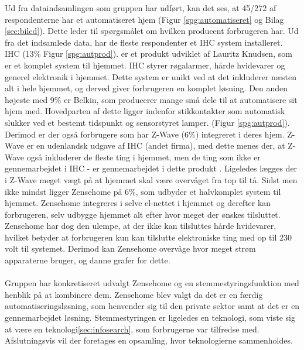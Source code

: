 Ud fra dataindsamlingen som gruppen har udført, kan det ses, at 45/272 af respondenterne har et automatiseret hjem (Figur \ref{spg:automatiseret} og Bilag \ref{sec:bilcd}). Dette leder til spørgsmålet om hvilken producent forbrugeren har. Ud fra det indsamlede data, har de fleste respondenter et IHC system installeret.
IHC (13\% Figur \ref{spg:autprod}). er et produkt udviklet af Lauritz Knudsen, som er et komplet system til hjemmet. IHC styrer røgalarmer, hårde hvidevarer og generel elektronik i hjemmet. Dette system er unikt ved at det inkluderer næsten alt i hele hjemmet, og derved giver forbrugeren en komplet løsning. Den anden højeste med 9\% er Belkin, som producerer mange små dele til at automatisere sit hjem med. Hovedparten af dette ligger indenfor stikkontakter som automatisk slukker ved et bestemt tidspunkt og sensorstyret lamper. (Figur \ref{spg:autprod}). Derimod er der også forbrugere som har Z-Wave (6\%) integreret i deres hjem. Z-Wave er en udenlandsk udgave af IHC (andet firma), med dette menes der, at Z-Wave også inkluderer de fleste ting i hjemmet, men de ting som ikke er gennemarbejdet i IHC - er gennemarbejdet i dette produkt \cite{IHCForum}. Ligeledes lægges der i Z-Wave meget vægt på at hjemmet skal være overvåget fra top til tå. Sidst men ikke mindst ligger Zensehome på 6\%, som udbyder et halvkomplet system til hjemmet. Zensehome integreres i selve el-nettet i hjemmet og derefter kan forbrugeren, selv udbygge hjemmet alt efter hvor meget der ønskes tilsluttet. Zensehome har dog den ulempe, at der ikke kan tilsluttes hårde hvidevarer, hvilket betyder at forbrugeren kun kan tilslutte elektroniske ting med op til 230 volt til systemet. Derimod kan Zensehome overvåge hvor meget strøm apparaterne bruger, og danne grafer for dette.\\\\
Gruppen har konkretiseret udvalgt Zensehome og en stemmestyringsfunktion med henblik på at kombinere dem. Zensehome blev valgt da det er en færdig automatiseringsløsning, som henvender sig til den private sektor samt at det er en gennemarbejdet løsning. Stemmestyringen er ligeledes en teknologi, som viste sig at være en teknologi\ref{sec:infosearch}, som forbrugerne var tilfredse med. Afslutningsvis vil der foretages en opsamling, hvor teknologierne sammenholdes.